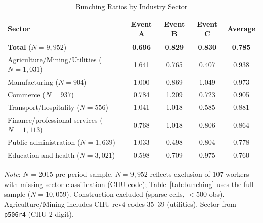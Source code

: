 \documentclass[12pt]{article}
\begin{document}
\begin{appendices}
\begin{table}[H]
\centering
\caption{Bunching Ratios by Industry Sector}
\label{tab:hetero_industry}
\begin{threeparttable}
\small
\begin{tabular}{lcccc}
\toprule
Sector & Event A & Event B & Event C & Average \\
\midrule
\textbf{Total} ($N = 9{,}952$) & \textbf{0.696} & \textbf{0.829} & \textbf{0.830} & \textbf{0.785} \\
Agriculture/Mining/Utilities ($N = 1{,}031$) & 1.641 & 0.765 & 0.407 & 0.938 \\
Manufacturing ($N = 904$) & 1.000 & 0.869 & 1.049 & 0.973 \\
Commerce ($N = 937$) & 0.784 & 1.209 & 0.723 & 0.905 \\
Transport/hospitality ($N = 556$) & 1.041 & 1.018 & 0.585 & 0.881 \\
Finance/professional services ($N = 1{,}113$) & 0.768 & 1.018 & 0.806 & 0.864 \\
Public administration ($N = 1{,}639$) & 1.033 & 0.498 & 0.804 & 0.778 \\
Education and health ($N = 3{,}021$) & 0.598 & 0.709 & 0.975 & 0.760 \\
\bottomrule
\end{tabular}
\begin{tablenotes}
\small
\item \textit{Note}: $N$ = 2015 pre-period sample. $N = 9{,}952$ reflects exclusion of 107 workers with missing sector classification (CIIU code); Table~\ref{tab:bunching} uses the full sample ($N = 10{,}059$). Construction excluded (sparse cells, $< 500$ obs). Agriculture/Mining includes CIIU rev4 codes 35--39 (utilities). Sector from \texttt{p506r4} (CIIU 2-digit).
\end{tablenotes}
\end{threeparttable}
\end{table}


\end{appendices}
\end{document}
